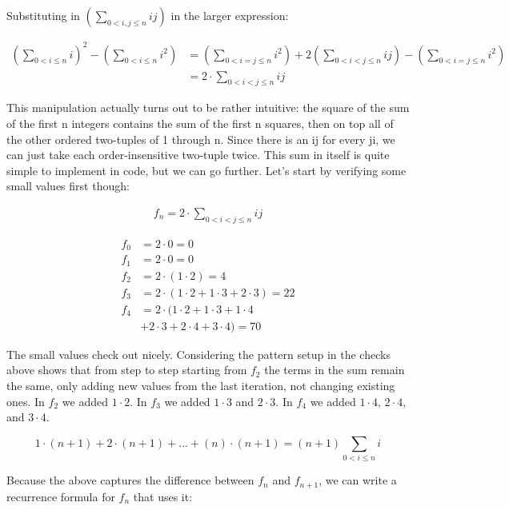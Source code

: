 \documentclass{article}
\begin{document}
Substituting in $\left( \sum_{0 < i, j \le n} i j \right)$
in the larger expression:

\begin{align*}
    \left( \sum_{0 < i \le n} i \right)^2 
    - \left(\sum_{0 < i \le n} i^2\right) &=
    \left(\sum_{0 < i = j \le n} i^2\right)
    + 2 \left(\sum_{0 < i < j \le n} i j\right)
    - \left(\sum_{0 < i = j \le n} i^2\right)
    \\
    &= 2 \cdot \sum_{0 < i < j \le n} i j
\end{align*}

This manipulation actually turns out to be rather intuitive: the square of
the sum of the first n integers contains the sum of the first n squares,
then on top all of the other ordered two-tuples of 1 through n.  Since
there is an ij for every ji, we can just take each order-insensitive
two-tuple twice.  This sum in itself is quite simple to implement in code,
but we can go further.  Let's start by verifying some small values first though:

\begin{align*}
    f_n = 2 \cdot \sum_{0 < i < j \le n} i j
\end{align*}

\begin{align*}
    f_0 &= 2 \cdot 0 = 0 \\
    f_1 &= 2 \cdot 0 = 0 \\
    f_2 &= 2 \cdot (1 \cdot 2) = 4 \\
    f_3 &= 2 \cdot (1 \cdot 2 + 1 \cdot 3 + 2 \cdot 3) = 22 \\
    f_4 &= 2 \cdot (1 \cdot 2 + 1 \cdot 3 + 1 \cdot 4 \\
    & + 2 \cdot 3 + 2 \cdot 4 + 3 \cdot 4) = 70
\end{align*}

The small values check out nicely.  Considering the pattern setup in the checks
above shows that from step to step starting from $f_2$ the terms in the sum
remain the same, only adding new values from the last iteration, not changing
existing ones.  In $f_2$ we added $1 \cdot 2$.  In $f_3$ we added
$1 \cdot 3$ and $2 \cdot 3$.  In $f_4$ we added $1 \cdot 4$, $2 \cdot 4$,
and $3 \cdot 4$.

\begin{equation*}
    1 \cdot (n + 1) + 2 \cdot (n + 1) + ... + (n) \cdot (n + 1)
    = (n + 1) \sum_{0 < i \le n} i
\end{equation*}

Because the above captures the difference between $f_n$ and $f_{n + 1}$,
we can write a recurrence formula for $f_n$ that uses it:
\end{document}
